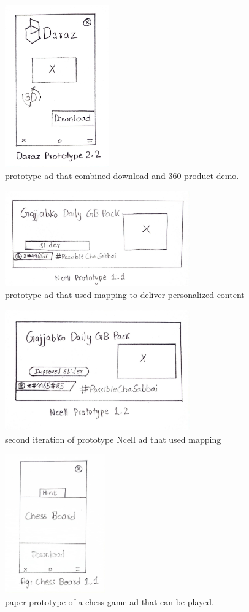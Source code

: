 \documentclass[journal]{IEEEtran}
\begin{document}
\begin{figure}[H]
    \centering
    \includegraphics[height=7cm]{dp5.png}
    \caption{prototype ad that combined download and 360\textdegree{} product demo.}
\end{figure}

\begin{figure}[H]
    \centering
    \includegraphics[width=8cm]{ncell1.jpg}
    \caption{prototype ad that used mapping to deliver personalized content}
\end{figure}

\begin{figure}[H]
    \centering
    \includegraphics[width=8cm]{ncell2.jpg}
    \caption{second iteration of prototype Ncell ad that used mapping}
\end{figure}

\begin{figure}[H]
    \centering
    \includegraphics[height=6cm]{chess1.jpg}
    \caption{paper prototype of a chess game ad that can be played.}
\end{figure}
\end{document}
